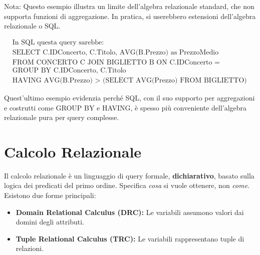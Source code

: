 Nota: Questo esempio illustra un limite dell'algebra relazionale standard, che non supporta funzioni di aggregazione. In pratica, si userebbero estensioni dell'algebra relazionale o SQL.

\begin{align*}
	& \text{In SQL questa query sarebbe:} \\
	& \text{SELECT C.IDConcerto, C.Titolo, AVG(B.Prezzo) as PrezzoMedio} \\
	& \text{FROM CONCERTO C JOIN BIGLIETTO B ON C.IDConcerto = B.IDConcerto} \\
	& \text{GROUP BY C.IDConcerto, C.Titolo} \\
	& \text{HAVING AVG(B.Prezzo) > (SELECT AVG(Prezzo) FROM BIGLIETTO)}
\end{align*}

\noindent Quest'ultimo esempio evidenzia perché SQL, con il suo supporto per aggregazioni e costrutti come GROUP BY e HAVING, è spesso più conveniente dell'algebra relazionale pura per query complesse.

\section{Calcolo Relazionale}
Il calcolo relazionale è un linguaggio di query formale, \textbf{dichiarativo}, basato sulla logica dei predicati del primo ordine. Specifica \textit{cosa} si vuole ottenere, non \textit{come}.
Esistono due forme principali:
\begin{itemize}
	\item \textbf{Domain Relational Calculus (DRC):} Le variabili assumono valori dai domini degli attributi.
	\item \textbf{Tuple Relational Calculus (TRC):} Le variabili rappresentano tuple di relazioni.
\end{itemize}

